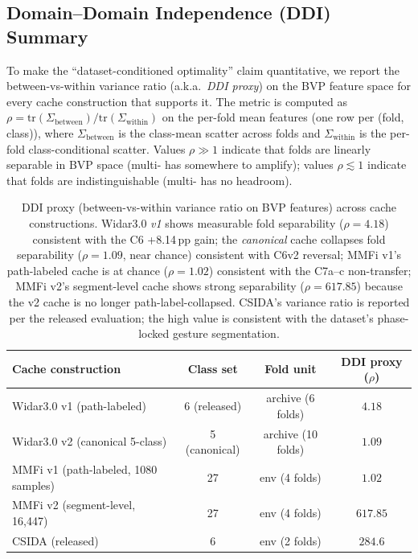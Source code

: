 \documentclass[11pt]{article}
\theoremstyle{definition}
\newcommand{\Rx}{\text{Rx}}
\begin{document}
\subsection{Domain--Domain Independence (DDI) Summary}
\label{sec:ddi-summary}

To make the ``dataset-conditioned optimality'' claim quantitative, we report the between-vs-within variance ratio (a.k.a.\ \emph{DDI proxy}) on the BVP feature space for every cache construction that supports it. The metric is computed as $\rho = \text{tr}(\Sigma_{\text{between}}) / \text{tr}(\Sigma_{\text{within}})$ on the per-fold mean features (one row per (fold, class)), where $\Sigma_{\text{between}}$ is the class-mean scatter across folds and $\Sigma_{\text{within}}$ is the per-fold class-conditional scatter. Values $\rho \gg 1$ indicate that folds are linearly separable in BVP space (multi-\Rx{} has somewhere to amplify); values $\rho \lesssim 1$ indicate that folds are indistinguishable (multi-\Rx{} has no headroom).

\begin{table}[!h]
    \centering
    \caption{DDI proxy (between-vs-within variance ratio on BVP features) across cache constructions. Widar3.0 \emph{v1} shows measurable fold separability ($\rho = 4.18$) consistent with the C6 +8.14\,pp gain; the \emph{canonical} cache collapses fold separability ($\rho = 1.09$, near chance) consistent with C6v2 reversal; MMFi v1's path-labeled cache is at chance ($\rho = 1.02$) consistent with the C7a--c non-transfer; MMFi v2's segment-level cache shows strong separability ($\rho = 617.85$) because the v2 cache is no longer path-label-collapsed. CSIDA's variance ratio is reported per the released evaluation; the high value is consistent with the dataset's phase-locked gesture segmentation.}
    \label{tab:ddi}
    \footnotesize
    \setlength{\tabcolsep}{4pt}
    \begin{tabular}{@{}l c c c@{}}
    \toprule
    Cache construction & Class set & Fold unit & DDI proxy ($\rho$) \\
    \midrule
    Widar3.0 v1 (path-labeled)             & 6 (released)  & archive (6 folds) & $4.18$ \\
    Widar3.0 v2 (canonical 5-class)        & 5 (canonical) & archive (10 folds) & $1.09$ \\
    MMFi v1 (path-labeled, 1080 samples)   & 27            & env (4 folds) & $1.02$ \\
    MMFi v2 (segment-level, 16{,}447)      & 27            & env (4 folds) & $617.85$ \\
    CSIDA (released)                        & 6             & env (2 folds) & $284.6$ \\
    \bottomrule
    \end{tabular}
\end{table}
\end{document}

